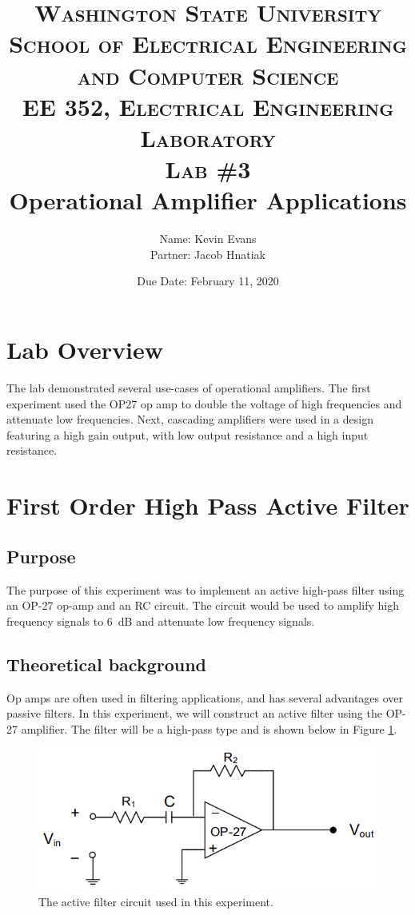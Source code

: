 \documentclass{report}
\title{
	\textsc{ \small
		Washington State University \\
		School of Electrical Engineering and Computer Science \\
		EE 352, Electrical Engineering Laboratory
	} \\
	{\textsc{\small Lab \#3}} \\
	Operational Amplifier Applications
}
\author{
	Name: Kevin Evans \\
	Partner: Jacob Hnatiak
}
\date{Due Date: February 11, 2020}
\begin{document}
	\maketitle
	
	\section*{Lab Overview}
	The lab demonstrated several use-cases of operational amplifiers. The first experiment used the OP27 op amp to double the voltage of high frequencies and attenuate low frequencies. Next, cascading amplifiers were used in a design featuring a high gain output, with low output resistance and a high input resistance.
	
	\section{First Order High Pass Active Filter}
	
	\subsection{Purpose}
	The purpose of this experiment was to implement an active high-pass filter using an OP-27 op-amp and an RC circuit. The circuit would be used to amplify high frequency signals to \SI{6}{\dB} and attenuate low frequency signals. 
	
	
	\subsection{Theoretical background}
	
	Op amps are often used in filtering applications, and has several advantages over passive filters. In this experiment, we will construct an active filter using the OP-27 amplifier. The filter will be a high-pass type and is shown below in Figure \ref{fig:exp1filter}. 
	
	\begin{figure}[h]
		\centering
		\includegraphics[width=0.5\linewidth]{exp1filter}
		\caption{The active filter circuit used in this experiment.}
		\label{fig:exp1filter}
	\end{figure}
\end{document}
